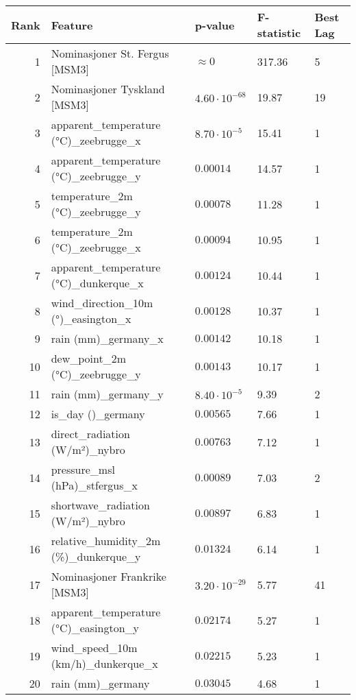 \begin{table}[H]
    \centering
    \small
    \begin{tabular}{r l l l l}
        \hline
        \textbf{Rank} & \textbf{Feature} & \textbf{p-value} & \textbf{F-statistic} & \textbf{Best Lag} \\
        \hline
        1 & Nominasjoner St. Fergus [MSM3] & $\approx 0$ & 317.36 & 5 \\
        2 & Nominasjoner Tyskland [MSM3] & $4.60 \cdot 10^{-68}$ & 19.87 & 19 \\
        3 & apparent\_temperature (°C)\_zeebrugge\_x & $8.70 \cdot 10^{-5}$ & 15.41 & 1 \\
        4 & apparent\_temperature (°C)\_zeebrugge\_y & $0.00014$ & 14.57 & 1 \\
        5 & temperature\_2m (°C)\_zeebrugge\_y & $0.00078$ & 11.28 & 1 \\
        6 & temperature\_2m (°C)\_zeebrugge\_x & $0.00094$ & 10.95 & 1 \\
        7 & apparent\_temperature (°C)\_dunkerque\_x & $0.00124$ & 10.44 & 1 \\
        8 & wind\_direction\_10m (°)\_easington\_x & $0.00128$ & 10.37 & 1 \\
        9 & rain (mm)\_germany\_x & $0.00142$ & 10.18 & 1 \\
        10 & dew\_point\_2m (°C)\_zeebrugge\_y & $0.00143$ & 10.17 & 1 \\
        11 & rain (mm)\_germany\_y & $8.40 \cdot 10^{-5}$ & 9.39 & 2 \\
        12 & is\_day ()\_germany & $0.00565$ & 7.66 & 1 \\
        13 & direct\_radiation (W/m²)\_nybro & $0.00763$ & 7.12 & 1 \\
        14 & pressure\_msl (hPa)\_stfergus\_x & $0.00089$ & 7.03 & 2 \\
        15 & shortwave\_radiation (W/m²)\_nybro & $0.00897$ & 6.83 & 1 \\
        16 & relative\_humidity\_2m (\%)\_dunkerque\_y & $0.01324$ & 6.14 & 1 \\
        17 & Nominasjoner Frankrike [MSM3] & $3.20 \cdot 10^{-29}$ & 5.77 & 41 \\
        18 & apparent\_temperature (°C)\_easington\_y & $0.02174$ & 5.27 & 1 \\
        19 & wind\_speed\_10m (km/h)\_dunkerque\_x & $0.02215$ & 5.23 & 1 \\
        20 & rain (mm)\_germany & $0.03045$ & 4.68 & 1 \\

\end{tabular}
\end{table}
